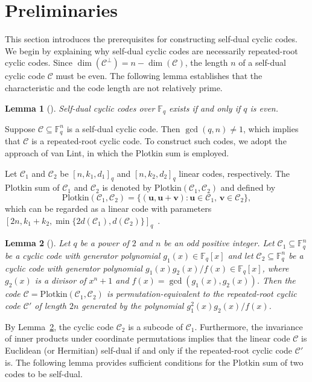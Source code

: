 \documentclass[journal,12pt,onecolumn]{IEEEtran}
\newtheorem{lemma}{Lemma}
\begin{document}
\section{Preliminaries}
\label{2}
This section introduces the prerequisites for constructing self-dual cyclic codes. We begin by explaining why self-dual cyclic codes are necessarily repeated-root cyclic codes. Since $\dim(\mathcal{C}^\perp) = n - \dim(\mathcal{C})$, the length $n$ of a self-dual cyclic code $\mathcal{C}$ must be even. The following lemma establishes that the characteristic and the code length are not relatively prime.

\begin{lemma}[\cite{2008On}]
    Self-dual cyclic codes over $\mathbb{F}_q$ exists if and only if $q$ is even.
\end{lemma}

Suppose $\mathcal{C} \subseteq \mathbb{F}_q^n$ is a self-dual cyclic code. Then $\gcd(q,n) \ne 1$, which implies that $\mathcal{C}$ is a repeated-root cyclic code. To construct such codes, we adopt the approach of van Lint, in which the Plotkin sum is employed.

Let $\mathcal{C}_1$ and $\mathcal{C}_2$ be $[n,k_1,d_1]_q$ and $[n,k_2,d_2]_q$ linear codes, respectively.
The Plotkin sum of $\mathcal{C}_1$ and $\mathcal{C}_2$ is denoted by $\text{Plotkin}(\mathcal{C}_1,\mathcal{C}_2)$ and defined by
\[
\text{Plotkin}(\mathcal{C}_1,\mathcal{C}_2)=\{(\textbf{u},\textbf{u}+\textbf{v}):\textbf{u}\in \mathcal{C}_1,\,\textbf{v}\in\mathcal{C}_2\},
\]
which can be regarded as a linear code with parameters $[2n,k_1+k_2,\min\{2d(\mathcal{C}_1),d(\mathcal{C}_2)\}]_q$~\cite{MacWilliamsSloane1977}.

\begin{lemma}[\cite{10856234}]
\label{van lint}
    Let $q$ be a power of $2$ and $n$ be an odd positive integer. Let $\mathcal{C}_1\subseteq\mathbb{F}_q^n$ be a cyclic code with generator polynomial $g_1(x)\in\mathbb{F}_q[x]$ and let $\mathcal{C}_2\subseteq\mathbb{F}_q^n$ be a cyclic code with generator polynomial $g_1(x)g_2(x)/f(x)\in\mathbb{F}_q[x]$, where $g_2(x)$ is a divisor of $x^n+1$ and $f(x)=\gcd(g_1(x),g_2(x))$. Then the code $\mathcal{C}=\text{Plotkin}(\mathcal{C}_1,\mathcal{C}_2)$ is permutation-equivalent to the repeated-root cyclic code $\mathcal{C}'$ of length $2n$ generated by the polynomial $g_1^2(x)g_2(x)/f(x)$.
\end{lemma}

By Lemma~\ref{van lint}, the cyclic code $\mathcal{C}_2$ is a subcode of $\mathcal{C}_1$. Furthermore, the invariance of inner products under coordinate permutations implies that the linear code $\mathcal{C}$ is Euclidean (or Hermitian) self-dual if and only if the repeated-root cyclic code $\mathcal{C}'$ is. The following lemma provides sufficient conditions for the Plotkin sum of two codes to be self-dual.
\end{document}
